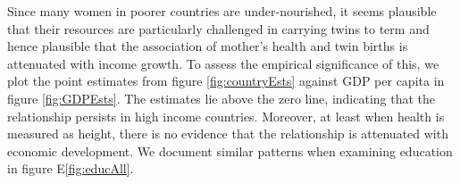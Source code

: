 \documentclass{nature}
\begin{document}
\begin{linenumbers}
Since many women in poorer countries are under-nourished, it seems plausible that their resources are particularly challenged in carrying twins to term and hence plausible that the association of mother's health and twin births is attenuated with income growth. To assess the empirical significance of this, we plot the point estimates from figure \ref{fig:countryEsts} against GDP per capita in figure \ref{fig:GDPEsts}. The estimates lie above the zero line, indicating that the relationship persists in high income countries. Moreover, at least when health is measured as height, there is no evidence that the relationship is attenuated with economic development. %
We document similar patterns when examining education in figure E\ref{fig:educAll}. 



\end{linenumbers}
\end{document}
